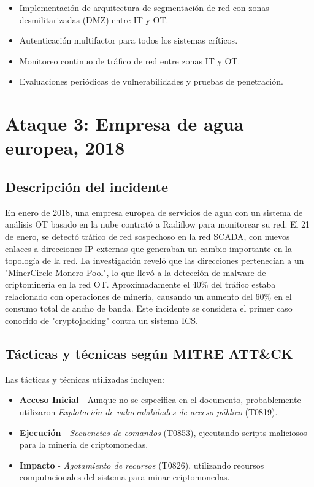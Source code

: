 \begin{itemize}
    \item Implementación de arquitectura de segmentación de red con zonas desmilitarizadas (DMZ) entre IT y OT.
    \item Autenticación multifactor para todos los sistemas críticos.
    \item Monitoreo continuo de tráfico de red entre zonas IT y OT.
    \item Evaluaciones periódicas de vulnerabilidades y pruebas de penetración.
\end{itemize}

\section{Ataque 3: Empresa de agua europea, 2018}

\subsection{Descripción del incidente}
En enero de 2018, una empresa europea de servicios de agua con un sistema de análisis OT basado en la nube contrató a Radiflow para monitorear su red. El 21 de enero, se detectó tráfico de red sospechoso en la red SCADA, con nuevos enlaces a direcciones IP externas que generaban un cambio importante en la topología de la red. La investigación reveló que las direcciones pertenecían a un "MinerCircle Monero Pool", lo que llevó a la detección de malware de criptominería en la red OT. Aproximadamente el 40\% del tráfico estaba relacionado con operaciones de minería, causando un aumento del 60\% en el consumo total de ancho de banda. Este incidente se considera el primer caso conocido de "cryptojacking" contra un sistema ICS.

\subsection{Tácticas y técnicas según MITRE ATT\&CK}
Las tácticas y técnicas utilizadas incluyen:

\begin{itemize}
    \item \textbf{Acceso Inicial} - Aunque no se especifica en el documento, probablemente utilizaron \textit{Explotación de vulnerabilidades de acceso público} (T0819).
    
    \item \textbf{Ejecución} - \textit{Secuencias de comandos} (T0853), ejecutando scripts maliciosos para la minería de criptomonedas.
    
    \item \textbf{Impacto} - \textit{Agotamiento de recursos} (T0826), utilizando recursos computacionales del sistema para minar criptomonedas.
\end{itemize}

